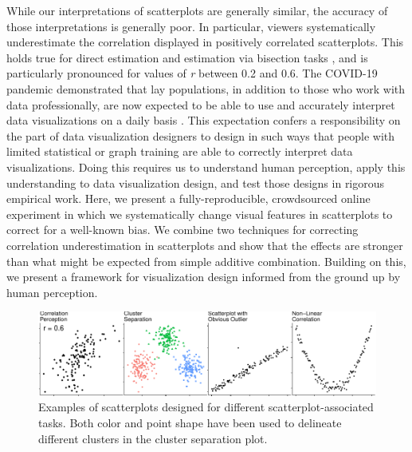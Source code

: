 \documentclass[manuscript, review, anonymous, screen]{acmart}
\begin{document}
While our interpretations of scatterplots are generally similar, the
accuracy of those interpretations is generally poor. In particular,
viewers systematically underestimate the correlation displayed in
positively correlated scatterplots. This holds true for direct
estimation
\citep{strahan_1978, bobko_1979, cleveland_1982, lane_1985, lauer_1989, collyer_1990, meyer_1992}
and estimation via bisection tasks \citep{rensink_2017}, and is
particularly pronounced for values of \emph{r} between 0.2 and 0.6. The
COVID-19 pandemic demonstrated that lay populations, in addition to
those who work with data professionally, are now expected to be able to
use and accurately interpret data visualizations on a daily basis
\citep{bbc_2022}. This expectation confers a responsibility on the part
of data visualization designers to design in such ways that people with
limited statistical or graph training are able to correctly interpret
data visualizations. Doing this requires us to understand human
perception, apply this understanding to data visualization design, and
test those designs in rigorous empirical work. Here, we present a
fully-reproducible, crowdsourced online experiment in which we
systematically change visual features in scatterplots to correct for a
well-known bias. We combine two techniques for correcting correlation
underestimation in scatterplots and show that the effects are stronger
than what might be expected from simple additive combination. Building
on this, we present a framework for visualization design informed from
the ground up by human perception.

\begin{figure}

{\centering \includegraphics[width=1\textwidth,height=\textheight]{size_and_opacity_files/figure-pdf/fig-tasks-1.pdf}

}

\caption{\label{fig-tasks}Examples of scatterplots designed for
different scatterplot-associated tasks. Both color and point shape have
been used to delineate different clusters in the cluster separation
plot.}

\end{figure}
\end{document}
